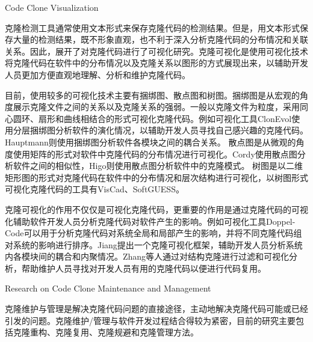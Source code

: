 {Code Clone Visualization}

克隆检测工具通常使用文本形式来保存克隆代码的检测结果。但是，用文本形式保存大量的检测结果，既不形象直观，也不利于深入分析克隆代码的分布情况和关联关系。因此，展开了对克隆代码进行了可视化研究。克隆可视化是使用可视化技术将克隆代码在软件中的分布情况以及克隆关系以图形的方式展现出来，以辅助开发人员更加方便直观地理解、分析和维护克隆代码。

目前，使用较多的可视化技术主要有捆绑图、散点图和树图。捆绑图是从宏观的角度展示克隆文件之间的关系以及克隆关系的强弱。一般以克隆文件为粒度，采用同心圆环、扇形和曲线相结合的形式可视化克隆代码\cite{hanjalic2013clonevol,hauptmann2012using,voinea2014visual}。例如可视化工具ClonEvol使用分层捆绑图分析软件的演化情况，以辅助开发人员寻找自己感兴趣的克隆代码\cite{hanjalic2013clonevol}。Hauptmann则使用捆绑图分析软件各模块之间的耦合关系\cite{hauptmann2012using}。
散点图是从微观的角度使用矩阵的形式对软件中克隆代码的分布情况进行可视化\cite{cordy2011exploring,higo2007method,livieri2007very}。Cordy使用散点图分析软件之间的相似性\cite{cordy2011exploring}，Higo则使用散点图分析软件中的克隆模式\cite{higo2007method,livieri2007very}。
树图是以二维矩形图的形式对克隆代码在软件中的分布情况和层次结构进行可视化，以树图形式可视化克隆代码的工具有VisCad\cite{asaduzzaman2011viscad,uddin2015comprehension}、SoftGUESS\cite{adar2007softguess}。

克隆可视化的作用不仅仅是可视化克隆代码，更重要的作用是通过克隆代码的可视化辅助软件开发人员分析克隆代码对软件产生的影响。例如可视化工具Doppel-Code可以用于分析克隆代码对系统全局和局部产生的影响，并将不同克隆代码组对系统的影响进行排序\cite{forbes2012doppel}。Jiang提出一个克隆可视化框架，辅助开发人员分析系统内各模块间的耦合和内聚情况\cite{jiang2007framework,jiang2006visualizing}。Zhang等人通过对结构克隆进行过滤和可视化分析，帮助维护人员寻找对开发人员有用的克隆代码以便进行代码复用\cite{zhang2008query}。


{Research on Code Clone Maintenance and Management}

克隆维护与管理是解决克隆代码问题的直接途径，主动地解决克隆代码可能或已经引发的问题。克隆维护/管理与软件开发过程结合得较为紧密，目前的研究主要包括克隆重构、克隆复用、克隆规避和克隆管理方法。

